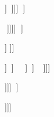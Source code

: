 ]]]]]




]]]]
]









































]
]]






]]]]]]]














































]]]]



]]]






































